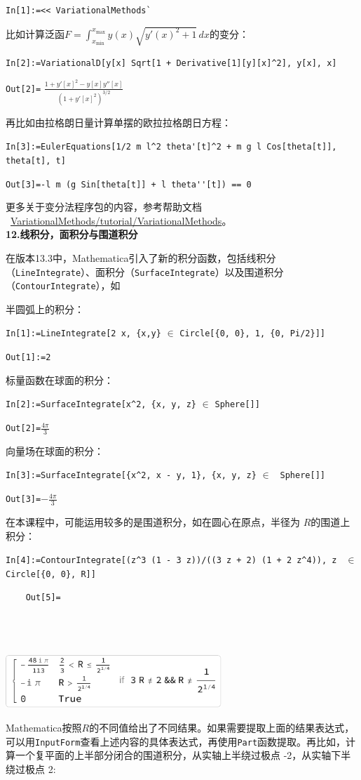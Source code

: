 \documentclass[UTF8,a4paper,10pt]{ctexart}
\newcommand{\mma}{Mathematica}
\begin{document}
\verb|In[1]:=<< VariationalMethods`| 

比如计算泛函$F=\int_{x_{\min }}^{x_{\max }} y(x) \sqrt{y'(x)^2+1} \, dx$的变分：

\verb|In[2]:=VariationalD[y[x] Sqrt[1 + Derivative[1][y][x]^2], y[x], x]| 

\verb|Out[2]=| $\frac{{1+y'[x]^2-y[x] y''[x]}}{({1+y'[x]^2})^{3/2}}$

再比如由拉格朗日量计算单摆的欧拉拉格朗日方程：

\verb|In[3]:=EulerEquations[1/2 m l^2 theta'[t]^2 + m g l Cos[theta[t]], theta[t], t]|

\verb|Out[3]=-l m (g Sin[theta[t]] + l theta''[t]) == 0|

更多关于变分法程序包的内容，参考帮助文档
~\href{http://reference.wolfram.com/language/VariationalMethods/tutorial/VariationalMethods.html}{VariationalMethods/tutorial/VariationalMethods}。
\\

\textbf{12.线积分，面积分与围道积分}

在版本13.3中，\mma 引入了新的积分函数，包括线积分（\verb|LineIntegrate|）、面积分（\verb|SurfaceIntegrate|）以及围道积分（\verb|ContourIntegrate|），如

半圆弧上的积分：

\verb|In[1]:=LineIntegrate[2 x, {x,y}| $\in$ \verb|Circle[{0, 0}, 1, {0, Pi/2}]]|  

\verb|Out[1]:=2|   

标量函数在球面的积分：

\verb|In[2]:=SurfaceIntegrate[x^2, {x, y, z}| $\in$ \verb|Sphere[]]|   

\verb|Out[2]=|$\frac{4\pi}{3}$   

向量场在球面的积分：

\verb|In[3]:=SurfaceIntegrate[{x^2, x - y, 1}, {x, y, z}| $\in$ \verb| Sphere[]]|   

\verb|Out[3]=|$-\frac{4\pi}{3}$   

在本课程中，可能运用较多的是围道积分，如在圆心在原点，半径为 $R$的围道上积分：

\verb|In[4]:=ContourIntegrate[(z^3 (1 - 3 z))/((3 z + 2) (1 + 2 z^4)), z | $\in$ \verb| Circle[{0, 0}, R]]|  

\noindent
\begin{minipage}[c]{0.1cm}
\verb|    Out[5]=|
\\\\\\\\
\end{minipage}
\hfill
\begin{minipage}[b]{14.3cm}\ccwd
\includegraphics[height=2cm]{img/ContourIntegrate.pdf}
\end{minipage}
\noindent
\mma 按照$R$的不同值给出了不同结果。如果需要提取上面的结果表达式，可以用\verb|InputForm|查看上述内容的具体表达式，再使用\verb|Part|函数提取。再比如，计算一个复平面的上半部分闭合的围道积分，从实轴上半绕过极点 -2，从实轴下半绕过极点 2:
\end{document}
